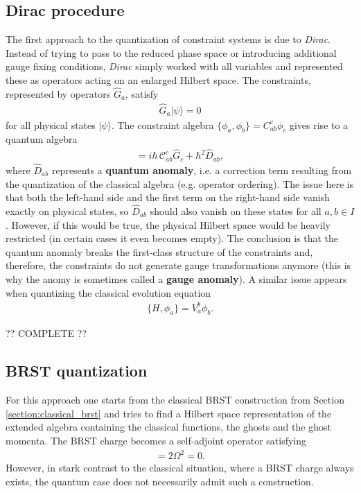 \subsection{Dirac procedure}

    The first approach to the quantization of constraint systems is due to \textit{Dirac}. Instead of trying to pass to the reduced phase space or introducing additional gauge fixing conditions, \textit{Dirac} simply worked with all variables and represented these as operators acting on an enlarged Hilbert space. The constraints, represented by operators $\hat{G}_a$, satisfy
    \begin{gather}
        \hat{G}_a|\psi\rangle=0
    \end{gather}
    for all physical states $|\psi\rangle$. The constraint algebra $\{\phi_a,\phi_b\} = C^c_{ab}\phi_c$ gives rise to a quantum algebra
    \begin{gather}
        [\hat{G}_a,\hat{G}_b] = i\hbar\,\mathcal{C}^c_{ab}\hat{G}_c + \hbar^2\hat{D}_{ab},
    \end{gather}
    where $\hat{D}_{ab}$ represents a \textbf{quantum anomaly}, i.e. a correction term resulting from the quantization of the classical algebra (e.g. operator ordering). The issue here is that both the left-hand side and the first term on the right-hand side vanish exactly on physical states, so $\hat{D}_{ab}$ should also vanish on these states for all $a,b\in I$. However, if this would be true, the physical Hilbert space would be heavily restricted (in certain cases it even becomes empty). The conclusion is that the quantum anomaly breaks the first-class structure of the constraints and, therefore, the constraints do not generate gauge transformations anymore (this is why the anomy is sometimes called a \textbf{gauge anomaly}). A similar issue appears when quantizing the classical evolution equation
    \begin{gather}
        \{H,\phi_a\} = V_a^b\phi_b.
    \end{gather}

    ?? COMPLETE ??

\subsection{BRST quantization}

    For this approach one starts from the classical BRST construction from Section \ref{section:classical_brst} and tries to find a Hilbert space representation of the extended algebra containing the classical functions, the ghosts and the ghost momenta. The BRST charge becomes a self-adjoint operator satisfying
    \begin{gather}
        [\Omega,\Omega] = 2\Omega^2 = 0.
    \end{gather}
    However, in stark contrast to the classical situation, where a BRST charge always exists, the quantum case does not necessarily admit such a construction.

